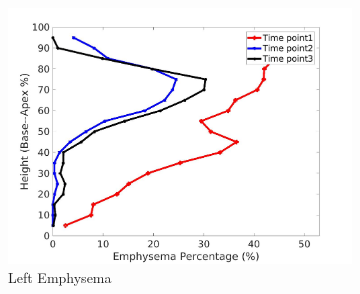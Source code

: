 \begin{figure}[H]
\begin{subfigure}{.42\linewidth}
  \includegraphics[width=\linewidth,trim={{.0\wd0} {.0\wd0} {.0\wd0} {.0\wd0}},clip]{Appendix/Image_AppexA/BaseToApex/IPF15LeftLungEmphysemaDiseaseAgainstHeight.jpg} %
  \caption{Left Emphysema}
  \label{fig:IPF15DiseaseAgainstHeight-g} 
\end{subfigure} 
\begin{subfigure}{.42\linewidth}%

\end{subfigure}
\end{figure}
